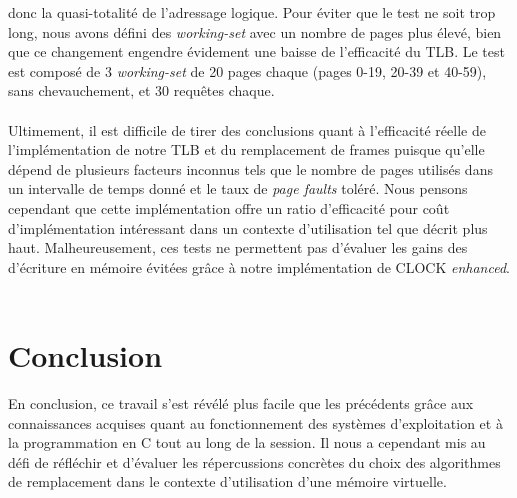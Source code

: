 \documentclass{article}
\begin{document}
donc la quasi-totalité de l’adressage logique. Pour éviter que le test ne soit trop long, nous avons défini des \emph{working-set} avec un 
nombre de pages plus élevé, bien que ce changement engendre évidement une baisse de l’efficacité du TLB. Le test est composé de 3 
\emph{working-set} de 20 pages chaque (pages 0-19, 20-39 et 40-59), sans chevauchement, et 30 requêtes chaque. \\
\\
Ultimement, il est difficile de tirer des conclusions quant à l’efficacité réelle de l’implémentation de notre TLB et du remplacement de frames 
puisque qu’elle dépend de plusieurs facteurs inconnus tels que le nombre de pages utilisés dans un intervalle de temps donné et le taux de 
\emph{page faults} toléré. Nous pensons cependant que cette implémentation offre un ratio d’efficacité pour coût d’implémentation intéressant 
dans un contexte d’utilisation tel que décrit plus haut. Malheureusement, ces tests ne permettent pas d’évaluer les gains des d’écriture en 
mémoire évitées grâce à notre implémentation de CLOCK \emph{enhanced}.\\
\\
\section{Conclusion}
\setlength{\parindent}{20pt}
En conclusion, ce travail s’est révélé plus facile que les précédents grâce aux connaissances acquises quant au fonctionnement des systèmes 
d’exploitation et à la programmation en C tout au long de la session. Il nous a cependant mis au défi de réfléchir et d’évaluer les  
répercussions concrètes du choix des algorithmes de remplacement dans le contexte d’utilisation d’une mémoire virtuelle.\\
\end{document}
